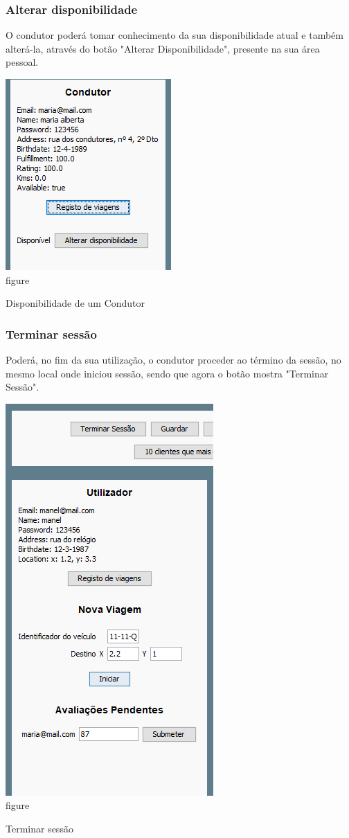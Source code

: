 \documentclass[a4paper]{article}
\begin{document}
\subsubsection{Alterar disponibilidade}
O condutor poderá tomar conhecimento da sua disponibilidade atual e também alterá-la, através do botão "Alterar Disponibilidade", presente na sua área pessoal.
\begin{center}
  \includegraphics[scale=0.75]{condutor_disponibilidade}\\
  \caption{figure}{Disponibilidade de um Condutor}
  \label{fig:picture}
\end{center}
\subsubsection{Terminar sessão}
Poderá, no fim da sua utilização, o condutor proceder ao término da sessão, no mesmo local onde iniciou sessão, sendo que agora o botão mostra "Terminar Sessão".
\begin{center}
  \includegraphics[scale=0.70]{terminarsessao}\\
  \caption{figure}{Terminar sessão}
  \label{fig:picture}
\end{center}
\end{document}
